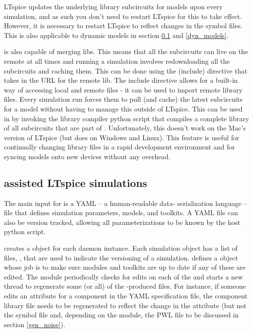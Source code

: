 LTspice updates the underlying library subcircuits for models upon every simulation,
and as such you don't need to restart LTspice for this to take effect. However,
it is necessary to restart LTspice to reflect changes in the symbol files. This is 
also applicable to  dynamic models in section \ref{sd_models} and \ref{dyn_models}.

 is also capable of merging libs. This means that all the subcircuits can live
on the remote at all times and running a simulation involves redownloading all the 
subcircuits and caching them. This can be done using the  (include) directive that takes
in the URL for the remote lib. The include directive allows for a built-in way of accessing local
and remote files - it can be used to import remote library files. Every simulation run forces
them to pull (and cache) the latest subcircuits for a model without having to manage this
outside of LTspice. This can be used in  by invoking the library compiler python script
that compiles a complete library of all subcircuits that are part of .
Unfortunately, this doesn't work on the Mac's version of LTspice  (but does on
Windows and Linux). This feature is useful for continually changing library files in 
a rapid development environment and for syncing models onto new devices without 
any overhead.



\subsection{ assisted LTspice simulations}\label{sd_models}

The main input for  is a YAML -- a human-readable data-
serialization language -- file that defines simulation parameters,  models, and
toolkits. A YAML file can also be version tracked, allowing all parameterizations to be known by the host
python script. 

 creates a  object for each daemon instance. Each simulation
object has a list of files, , that are used to indicate the versioning
of a simulation.  defines a  object whose job is to make sure
 modules and toolkits are up to date if any of these 
are edited. 
The  module periodically checks for edits on each of the 
and starts a new thread to regenerate some (or all) of the -produced files.
For instance, if someone edits an attribute for a component in the YAML specification file, 
the component library file needs to be regenerated to reflect the change in the attribute (but not the symbol file and, depending on the module, the PWL file to be discussed in section \ref{gen_noise}).

